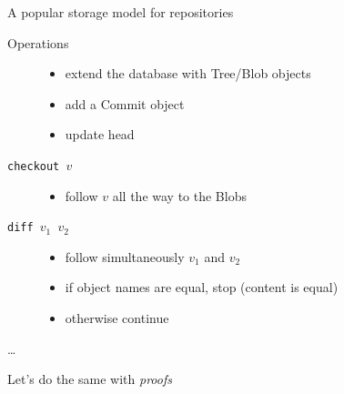 \documentclass[ignorenonframetext,red]{beamer}
\begin{document}
\begin{frame}{A popular storage model for repositories}
\begin{onlyenv}
\begin{onlyenv}
\begin{block}{Operations}
\begin{description}
          \begin{itemize}
          \item extend the database with \textsf{Tree}/\textsf{Blob}
            objects
          \item add a \textsf{Commit} object
          \item update head
          \end{itemize}
        \item[\texttt{checkout $v$}]
          \begin{itemize}
          \item follow $v$ all the way to the \textsf{Blob}s
          \end{itemize}
        \item[\texttt{diff $v_1$ $v_2$}]
          \begin{itemize}
          \item follow simultaneously $v_1$ and $v_2$
          \item if object names are equal, stop (content is equal)
          \item otherwise continue
          \end{itemize}
        \item[\dots]
        \end{description}
      \end{block}
    \pause\pause
    \begin{center}
      \vspace{2em} {\Large Let's do the same with \emph{proofs}}
    \end{center}
    \end{onlyenv}
  \end{onlyenv}
\end{frame}
\end{document}
